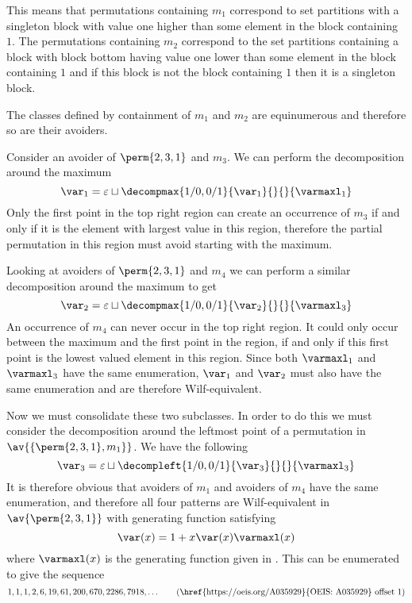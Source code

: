 This means that permutations containing \(m_1\) correspond to set partitions
with a singleton block with value one higher than some element in the
block containing \(1\). The permutations containing \(m_2\) correspond
to the set partitions containing a block with block bottom having value
one lower than some element in the block containing \(1\) and if this
block is not the block containing \(1\) then it is a singleton block.

The classes defined by containment of \(m_1\) and \(m_2\) are
equinumerous  and therefore so are their avoiders.

Consider an avoider of \(\perm{2,3,1}\) and \(m_3\). We can perform
the decomposition around the maximum
\begin{equation*}
    \scriptvar_1 = \varepsilon \sqcup
    \decompmax{1/0,0/1}{\scriptvar_1}{}{}{\mathcal{\varmaxl}_1}
\end{equation*}
Only the first point in the top right region can
create an occurrence of \(m_3\) if and only if it is the
element with largest value in this region, therefore the partial permutation
in this region must avoid starting with the maximum.

Looking at avoiders of \(\perm{2,3,1}\) and \(m_4\) we
can perform a similar decomposition around the maximum to get
\begin{equation*}
    \scriptvar_2 = \varepsilon \sqcup
    \decompmax{1/0,0/1}{\scriptvar_2}{}{}{\mathcal{\varmaxl}_3}
\end{equation*}
An occurrence of \(m_4\) can never occur in the
top right region. It could only occur between the maximum and the first point
in the region, if and only if this first point is the lowest valued element in
this region.
Since both \(\mathcal{\varmaxl}_1\) and \(\mathcal{\varmaxl}_3\) have the same
enumeration, \(\scriptvar_1\) and \(\scriptvar_2\) must also have
the same enumeration and are therefore Wilf-equivalent.

Now we must consolidate these two subclasses. In order to do this we must
consider the decomposition around the leftmost point of a permutation in
\(\av{\{\perm{2,3,1},m_1\}}\). We have the following
\begin{equation*}
    \scriptvar_3 = \varepsilon \sqcup
    \decompleft{1/0,0/1}{\scriptvar_3}{}{}{\mathcal{\varmaxl}_3}
\end{equation*}
It is therefore obvious that avoiders of \(m_1\) and avoiders of \(m_4\)
have the same enumeration, and therefore all four patterns are Wilf-equivalent
in \(\av{\perm{2,3,1}}\) with generating function satisfying
\begin{equation*}
    \var(x) = 1 + x\var(x)\varmaxl(x)
\end{equation*}
where \(\varmaxl(x)\) is the generating function given in .
This can be enumerated to give the sequence
\begin{equation*}
    1, 1, 1, 2, 6, 19, 61, 200, 670, 2286, 7918,\dotsc \tag{\href{https://oeis.org/A035929}{OEIS: A035929} offset 1}
\end{equation*}

